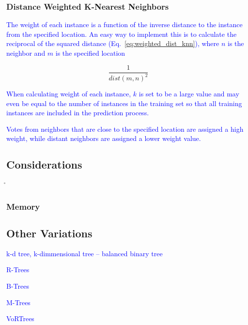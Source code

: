 \subsubsection{Distance Weighted K-Nearest Neighbors}

\textcolor{blue}{The weight of each instance is a function of the inverse distance to the instance from the specified location. An easy way to implement this is to calculate the reciprocal of the squared distance (Eq.~\ref{eq:weighted_dist_knn}), where $n$ is the neighbor and $m$ is the specified location}

\begin{equation}
{\frac{1}{{dist(m,n)}^2}}
\label{eq:weighted_dist_knn}
\end{equation}

\textcolor{blue}{When calculating weight of each instance, $k$ is set to be a large value and may even be equal to the number of instances in the training set so that all training instances are included in the prediction process.}

\textcolor{blue}{Votes from neighbors that are close to the specified location are assigned a high weight, while distant neighbors are assigned a lower weight value.}

\subsection{Considerations}


\r{}

\subsubsection{Memory}

\subsection{Other Variations}

\textcolor{blue}{k-d tree, k-dimmensional tree -- balanced binary tree}

\textcolor{blue}{R-Trees}

\textcolor{blue}{B-Trees}

\textcolor{blue}{M-Trees}

\textcolor{blue}{VoRTrees}